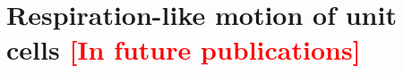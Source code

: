 \documentclass{article}
\begin{document}

\newpage
\section{Respiration-like motion of unit cells \textcolor{red}{[In future publications]}}
\end{document}
